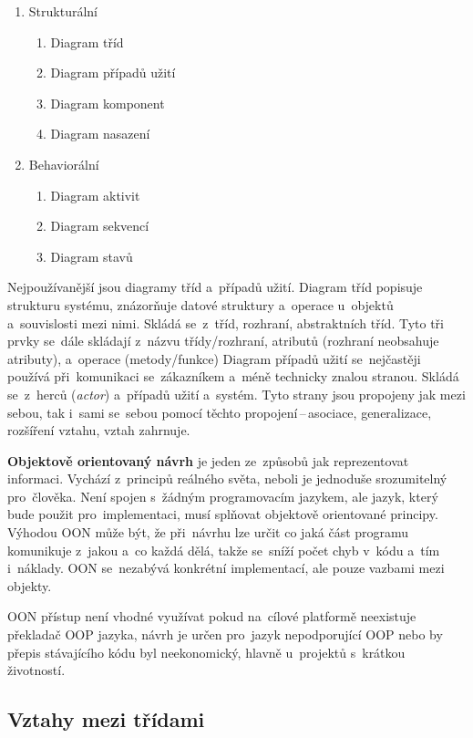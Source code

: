 \begin{enumerate}[noitemsep]
	\item Strukturální
	\begin{enumerate}[noitemsep]
		 \item Diagram tříd
		 \item Diagram případů užití
		 \item Diagram komponent
		 \item Diagram nasazení
	\end{enumerate}
	\item Behaviorální
	\begin{enumerate}[noitemsep]
		 \item Diagram aktivit
		 \item Diagram sekvencí
		 \item Diagram stavů
	\end{enumerate}
\end{enumerate}

Nejpoužívanější jsou diagramy tříd a~případů užití. Diagram tříd popisuje strukturu systému, znázorňuje datové struktury a~operace u~objektů a~souvislosti mezi nimi. Skládá se~z~tříd, rozhraní, abstraktních tříd. Tyto tři prvky se~dále skládají z~názvu třídy/rozhraní, atributů (rozhraní neobsahuje atributy), a~operace (metody/funkce) Diagram případů užití se~nejčastěji používá při~komunikaci se~zákazníkem a~méně technicky znalou stranou. Skládá se~z~herců (\emph{actor}) a~případů užití a~systém. Tyto strany jsou propojeny jak mezi sebou, tak i~sami se~sebou pomocí těchto propojení\,--\,asociace, generalizace, rozšíření vztahu, vztah zahrnuje.

\textbf{Objektově orientovaný návrh} je jeden ze~způsobů jak reprezentovat informaci. Vychází z~principů reálného světa, neboli je jednoduše srozumitelný pro~člověka. Není spojen s~žádným programovacím jazykem, ale jazyk, který bude použit pro~implementaci, musí splňovat objektově orientované principy. Výhodou OON může být, že při~návrhu lze určit co jaká část programu komunikuje z~jakou a~co každá dělá, takže se~sníží počet chyb v~kódu a~tím i~náklady. OON se~nezabývá konkrétní implementací, ale pouze vazbami mezi objekty.

OON přístup není vhodné využívat pokud na~cílové platformě neexistuje překladač OOP jazyka, návrh je určen pro~jazyk nepodporující OOP nebo by přepis stávajícího kódu byl neekonomický, hlavně u~projektů s~krátkou životností.

\subsection{Vztahy mezi třídami}

